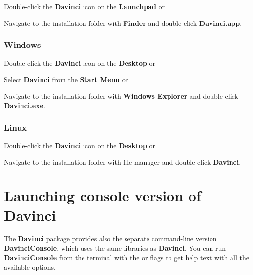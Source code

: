 \begin{boxitemize}
	\item Double-click the \textbf{Davinci} icon on the \textbf{Launchpad} or
	\item Navigate to the installation folder with \textbf{Finder} and double-click \textbf{Davinci.app}.
\end{boxitemize}

\subsubsection{Windows}

\begin{boxitemize}
	\item Double-click the \textbf{Davinci} icon on the \textbf{Desktop} or
	\item Select \textbf{Davinci} from the \textbf{Start Menu} or
	\item Navigate to the installation folder with \textbf{Windows Explorer} and double-click \textbf{Davinci.exe}.
\end{boxitemize}

\subsubsection{Linux}

\begin{boxitemize}
	\item Double-click the \textbf{Davinci} icon on the \textbf{Desktop} or
	\item Navigate to the installation folder with file manager and double-click \textbf{Davinci}.
\end{boxitemize}

\section{Launching console version of Davinci}
	
The \textbf{Davinci} package provides also the separate command-line version \textbf{DavinciConsole}, which uses the same libraries as \textbf{Davinci}. You can run \textbf{DavinciConsole} from the terminal with the  or  flags to get help text with all the available options.

